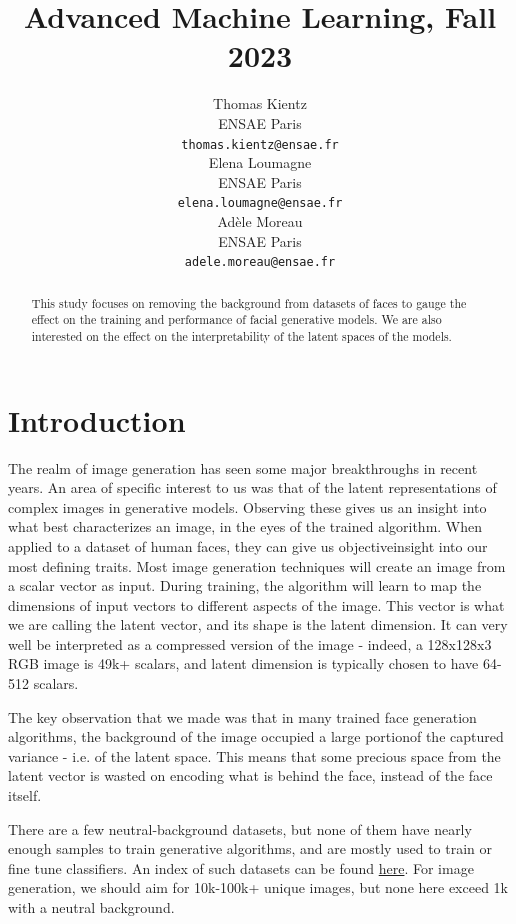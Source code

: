 \documentclass{article}
\title{Advanced Machine Learning, Fall 2023}
\author{%
  Thomas Kientz \\
  ENSAE Paris\\
  \texttt{thomas.kientz@ensae.fr} \\
  \And
  Elena Loumagne \\
  ENSAE Paris\\
  \texttt{elena.loumagne@ensae.fr} \\
  \AND
  Adèle Moreau \\
  ENSAE Paris\\
  \texttt{adele.moreau@ensae.fr} \\
}
\begin{document}
\maketitle

\begin{abstract}
  This study focuses on removing the background from datasets of faces to gauge the effect on the training and performance of facial generative models. We are also interested on the effect on the interpretability of the latent spaces of the models. 
\end{abstract}

\section{Introduction}

\quad The realm of image generation has seen some major breakthroughs in recent years. 
An area of specific interest to us was that of the latent representations of complex images in generative models. 
Observing these gives us an insight into what best characterizes an image, in the eyes of the trained algorithm. 
When applied to a dataset of human faces, they can give us objective\footnotemark insight into our most defining traits.
Most image generation techniques will create an image from a scalar vector as input. 
During training, the algorithm will learn to map the dimensions of input vectors to different aspects of the image. 
This vector is what we are calling the latent vector, and its shape is the latent dimension. 
It can very well be interpreted as a compressed version of the image - indeed, a 128x128x3 RGB image is 49k+ scalars, and latent dimension is typically chosen to have 64-512 scalars. 

The key observation that we made was that in many trained face generation algorithms, the background of the image occupied a large portion\footnotemark of the captured variance - i.e. of the latent space. 
This means that some precious space from the latent vector is wasted on encoding what is behind the face, instead of the face itself. 

There are a few neutral-background datasets, but none of them have nearly enough samples to train generative algorithms, and are mostly used to train or fine tune classifiers. 
An index of such datasets can be found \href{https://libguides.princeton.edu/facedatabases}{here}. 
For image generation, we should aim for 10k-100k+ unique images, but none here exceed 1k with a neutral background.
\end{document}
